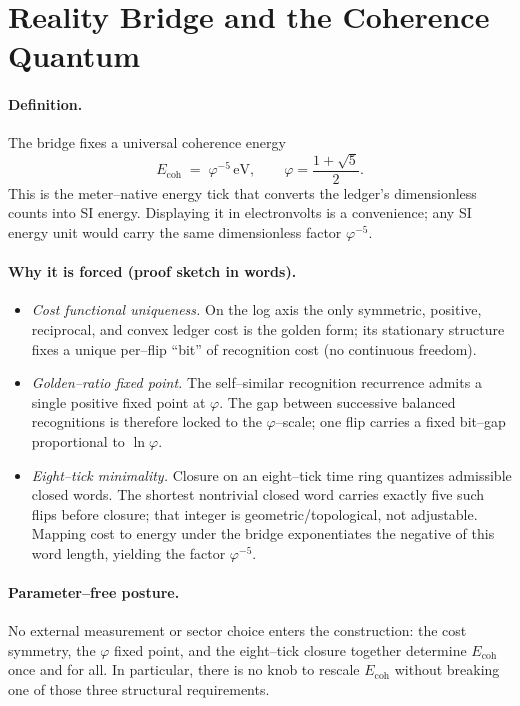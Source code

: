 \documentclass[epjc3]{svjour3}
\begin{document}
\section{Reality Bridge and the Coherence Quantum}

\paragraph{Definition.}
The bridge fixes a universal coherence energy
\[
E_{\mathrm{coh}} \;=\; \varphi^{-5}\,\mathrm{eV},
\qquad \varphi=\frac{1+\sqrt{5}}{2}.
\]
This is the meter–native energy tick that converts the ledger’s dimensionless counts into SI energy. Displaying it in electronvolts is a convenience; any SI energy unit would carry the same dimensionless factor $\varphi^{-5}$.

\paragraph{Why it is forced (proof sketch in words).}
\begin{itemize}
  \item \emph{Cost functional uniqueness.} On the log axis the only symmetric, positive, reciprocal, and convex ledger cost is the golden form; its stationary structure fixes a unique per–flip “bit” of recognition cost (no continuous freedom).
  \item \emph{Golden–ratio fixed point.} The self–similar recognition recurrence admits a single positive fixed point at $\varphi$. The gap between successive balanced recognitions is therefore locked to the $\varphi$–scale; one flip carries a fixed bit–gap proportional to $\ln\varphi$.
  \item \emph{Eight–tick minimality.} Closure on an eight–tick time ring quantizes admissible closed words. The shortest nontrivial closed word carries exactly five such flips before closure; that integer is geometric/topological, not adjustable. Mapping cost to energy under the bridge exponentiates the negative of this word length, yielding the factor $\varphi^{-5}$.
\end{itemize}

\paragraph{Parameter–free posture.}
No external measurement or sector choice enters the construction: the cost symmetry, the $\varphi$ fixed point, and the eight–tick closure together determine $E_{\mathrm{coh}}$ once and for all. In particular, there is no knob to rescale $E_{\mathrm{coh}}$ without breaking one of those three structural requirements.
\end{document}
